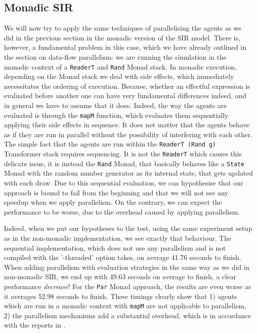 \subsection{Monadic SIR}
We will now try to apply the same techniques of parallelising the agents as we did in the previous section in the monadic version of the SIR model. There is, however, a fundamental problem in this case, which we have already outlined in the section on data-flow parallelism: we are running the simulation in the monadic context of a \texttt{ReaderT} and \texttt{Rand} Monad stack. In monadic execution, depending on the Monad stack we deal with side effects, which immediately necessitates the ordering of execution. Because, whether an effectful expression is evaluated before another one can have very fundamental differences indeed, and in general we have to assume that it does.
Indeed, the way the agents are evaluated is through the \texttt{mapM} function, which evaluates them sequentially applying their side effects in sequence. It does not matter that the agents behave as if they are run in parallel without the possibility of interfering with each other. The simple fact that the agents are run within the \texttt{ReaderT (Rand g)} Transformer stack requires sequencing. It is not the \texttt{ReaderT} which causes this delicate issue, it is instead the \texttt{Rand} Monad, that basically behaves like a \texttt{State} Monad with the random number generator as its internal state, that gets updated with each draw.
Due to this sequential evaluation, we can hypothesise that our approach is bound to fail from the beginning and that we will not see any speedup  when we apply parallelism. On the contrary, we can expect the performance to be worse, due to the overhead caused by applying parallelism.

Indeed, when we put our hypotheses to the test, using the same experiment setup as in the non-monadic implementation, we see exactly that behaviour. The sequential implementation, which does not use any parallelism and is not compiled with the '-threaded' option takes, on average 41.76 seconds to finish. When adding parallelism with evaluation strategies in the same way as we did in non-monadic SIR, we end up with 49.63 seconds on average to finish, a clear performance \textit{decrease}! For the \texttt{Par} Monad approach, the results are even worse as it averages 52.98 seconds to finish. These timings clearly show that 1) agents which are run in a monadic context with \texttt{mapM} are not applicable to parallelism, 2) the parallelism mechanisms add a substantial overhead, which is in accordance with the reports in \cite{marlow_parallel_2013}.

